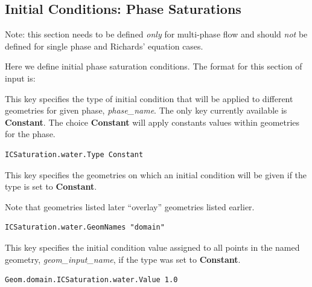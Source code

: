 
\subsection{Initial Conditions: Phase Saturations}
\label{Initial Conditions: Phase Saturations}

Note: this section needs to be defined {\em only} for multi-phase flow
and should {\em not} be defined for single phase and Richards' equation cases.

Here we define initial phase saturation conditions.
The format for this section of input is:

{
This key specifies the type of initial condition that will be applied
to different geometries for given phase, {\em phase\_name}.  The only
key currently available is {\bf Constant}.  The choice {\bf Constant}
will apply constants values within geometries for the phase.
}
\begin{display}\begin{verbatim}
ICSaturation.water.Type Constant
\end{verbatim}\end{display}

{
This key specifies the geometries on which an initial condition will be
given if the type is set to {\bf Constant}.

Note that geometries listed later ``overlay'' geometries listed earlier.
}
\begin{display}\begin{verbatim}
ICSaturation.water.GeomNames "domain"
\end{verbatim}\end{display}

{
This key specifies the initial condition value assigned to all points in
the named geometry, {\em geom\_input\_name}, if the type was set to
{\bf Constant}.
}
\begin{display}\begin{verbatim}
Geom.domain.ICSaturation.water.Value 1.0
\end{verbatim}\end{display}

